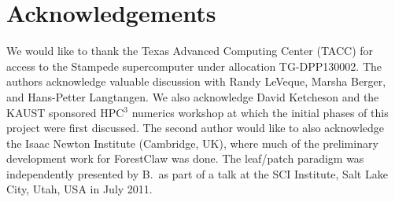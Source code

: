 \documentclass{IOS-Book-Article}     %
\newcommand{\forestclaw}{ForestClaw\xspace}
\begin{document}
\section*{Acknowledgements}

We would like to thank the Texas Advanced Computing Center (TACC) for access to
the Stampede supercomputer under allocation TG-DPP130002.
The authors acknowledge valuable discussion with Randy LeVeque, Marsha
Berger, and Hans-Petter Langtangen.  We also acknowledge David
Ketcheson and the KAUST sponsored HPC$^3$ numerics workshop at which
the initial phases of this project were first discussed.  The second
author would like to also acknowledge the Isaac Newton Institute
(Cambridge, UK), where much of the preliminary development work for
\forestclaw was done. The leaf/patch paradigm was independently
presented by B.\ as part of a talk at the SCI Institute, Salt Lake City, Utah,
USA in July 2011.




\end{document}

